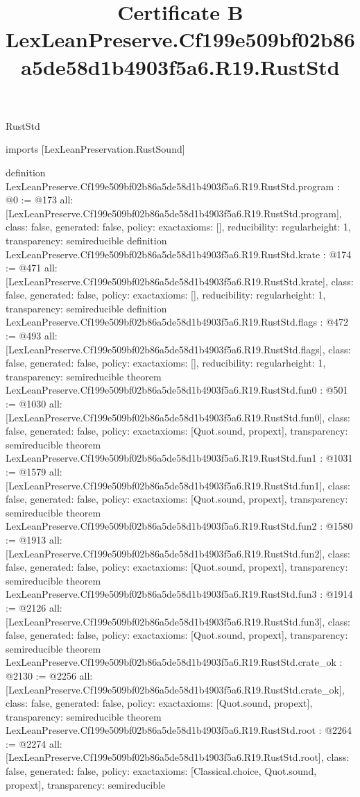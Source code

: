 \begin{lexlean}{RustStd}
\title{Certificate B LexLeanPreserve.Cf199e509bf02b86a5de58d1b4903f5a6.R19.RustStd}
\begin{coremodule}
imports [LexLeanPreservation.RustSound]

definition LexLeanPreserve.Cf199e509bf02b86a5de58d1b4903f5a6.R19.RustStd.program : @0 := @173 {
  all: [LexLeanPreserve.Cf199e509bf02b86a5de58d1b4903f5a6.R19.RustStd.program],
  class: false,
  generated: false,
  policy: exact{axioms: []},
  reducibility: regular{height: 1},
  transparency: semireducible
}
definition LexLeanPreserve.Cf199e509bf02b86a5de58d1b4903f5a6.R19.RustStd.krate : @174 := @471 {
  all: [LexLeanPreserve.Cf199e509bf02b86a5de58d1b4903f5a6.R19.RustStd.krate],
  class: false,
  generated: false,
  policy: exact{axioms: []},
  reducibility: regular{height: 1},
  transparency: semireducible
}
definition LexLeanPreserve.Cf199e509bf02b86a5de58d1b4903f5a6.R19.RustStd.flags : @472 := @493 {
  all: [LexLeanPreserve.Cf199e509bf02b86a5de58d1b4903f5a6.R19.RustStd.flags],
  class: false,
  generated: false,
  policy: exact{axioms: []},
  reducibility: regular{height: 1},
  transparency: semireducible
}
theorem LexLeanPreserve.Cf199e509bf02b86a5de58d1b4903f5a6.R19.RustStd.fun0 : @501 := @1030 {
  all: [LexLeanPreserve.Cf199e509bf02b86a5de58d1b4903f5a6.R19.RustStd.fun0],
  class: false,
  generated: false,
  policy: exact{axioms: [Quot.sound, propext]},
  transparency: semireducible
}
theorem LexLeanPreserve.Cf199e509bf02b86a5de58d1b4903f5a6.R19.RustStd.fun1 : @1031 := @1579 {
  all: [LexLeanPreserve.Cf199e509bf02b86a5de58d1b4903f5a6.R19.RustStd.fun1],
  class: false,
  generated: false,
  policy: exact{axioms: [Quot.sound, propext]},
  transparency: semireducible
}
theorem LexLeanPreserve.Cf199e509bf02b86a5de58d1b4903f5a6.R19.RustStd.fun2 : @1580 := @1913 {
  all: [LexLeanPreserve.Cf199e509bf02b86a5de58d1b4903f5a6.R19.RustStd.fun2],
  class: false,
  generated: false,
  policy: exact{axioms: [Quot.sound, propext]},
  transparency: semireducible
}
theorem LexLeanPreserve.Cf199e509bf02b86a5de58d1b4903f5a6.R19.RustStd.fun3 : @1914 := @2126 {
  all: [LexLeanPreserve.Cf199e509bf02b86a5de58d1b4903f5a6.R19.RustStd.fun3],
  class: false,
  generated: false,
  policy: exact{axioms: [Quot.sound, propext]},
  transparency: semireducible
}
theorem LexLeanPreserve.Cf199e509bf02b86a5de58d1b4903f5a6.R19.RustStd.crate_ok : @2130 := @2256 {
  all: [LexLeanPreserve.Cf199e509bf02b86a5de58d1b4903f5a6.R19.RustStd.crate_ok],
  class: false,
  generated: false,
  policy: exact{axioms: [Quot.sound, propext]},
  transparency: semireducible
}
theorem LexLeanPreserve.Cf199e509bf02b86a5de58d1b4903f5a6.R19.RustStd.root : @2264 := @2274 {
  all: [LexLeanPreserve.Cf199e509bf02b86a5de58d1b4903f5a6.R19.RustStd.root],
  class: false,
  generated: false,
  policy: exact{axioms: [Classical.choice, Quot.sound, propext]},
  transparency: semireducible
}


\end{coremodule}
\end{lexlean}

